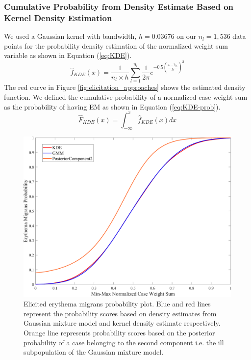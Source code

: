 \subsubsection{Cumulative Probability from Density Estimate Based on Kernel Density Estimation}
\label{sec:KDE-approach}
We used a Gaussian kernel with bandwidth, $h=0.03676$ on our $n_l=1,536$ data points for the probability density estimation of the normalized weight sum variable as shown in Equation (\ref{eq:KDE}).
\begin{equation}
	\label{eq:KDE}
	\hat{f}_{KDE}\left(x\right) = \frac{1}{n_l\times h}\sum_{l = 1}^{n_l}\frac{1}{2\pi }e^{-0.5\left(\frac{x-\tilde{s}_{c_{l}}}{h }\right)^{2}}
\end{equation}
The red curve in Figure \ref{fig:elicitation_approaches} shows the estimated density function. We defined the cumulative probability of a normalized case weight sum as the probability of having EM as shown in Equation (\ref{eq:KDE-prob}).
\begin{equation}
	\label{eq:KDE-prob}
	\hat{F}_{KDE}\left(x\right) =  \int_{-\infty }^{x}\hat{f}_{KDE}\left(x\right)dx
\end{equation}
\begin{figure}[htb!]
	\centering
	\includegraphics[width=\textwidth, keepaspectratio]{images/elicitation/probability-plot.pdf}
	\caption[Elicited erythema migrans probability plot]{Elicited erythema migrans probability plot. Blue and red lines represent the probability scores based on density estimates from Gaussian mixture model and kernel density estimate respectively. Orange line represents probability scores based on the posterior probability of a case belonging to the second component i.e. the ill subpopulation of the Gaussian mixture model.}
	\label{fig:probability_plot}
\end{figure}

